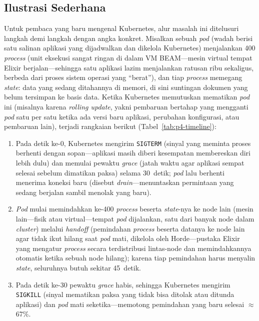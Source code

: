 \subsection{Ilustrasi Sederhana}
\label{subsec:p4-ilustrasi}
Untuk pembaca yang baru mengenal Kubernetes, alur masalah ini ditelusuri langkah demi
langkah dengan angka konkret. Misalkan sebuah \emph{pod} (wadah berisi satu salinan aplikasi
yang dijadwalkan dan dikelola Kubernetes) menjalankan 400 \emph{process} (unit eksekusi
sangat ringan di dalam VM BEAM---mesin virtual tempat Elixir berjalan---sehingga satu
aplikasi lazim menjalankan ratusan ribu sekaligus, berbeda dari proses sistem operasi yang
``berat''), dan tiap \emph{process} memegang \emph{state}: data yang sedang ditahannya di
memori, di sini suntingan dokumen yang belum tersimpan ke basis data. Ketika Kubernetes
memutuskan mematikan \emph{pod} ini (misalnya karena \emph{rolling update}, yakni pembaruan
bertahap yang mengganti \emph{pod} satu per satu ketika ada versi baru aplikasi, perubahan
konfigurasi, atau pembaruan lain), terjadi rangkaian berikut (Tabel~\ref{tab:p4-timeline}):

\begin{enumerate}[nosep,leftmargin=2em]
  \item Pada detik ke-0, Kubernetes mengirim \texttt{SIGTERM} (sinyal yang meminta proses
        berhenti dengan sopan---aplikasi masih diberi kesempatan membereskan diri lebih
        dulu) dan memulai pewaktu \emph{grace} (jatah waktu agar aplikasi sempat selesai
        sebelum dimatikan paksa) selama 30~detik; \emph{pod} lalu berhenti menerima koneksi
        baru (disebut \emph{drain}---menuntaskan permintaan yang sedang berjalan sambil
        menolak yang baru).
  \item \emph{Pod} mulai memindahkan ke-400 \emph{process} beserta \emph{state}-nya ke node
        lain (mesin lain---fisik atau virtual---tempat \emph{pod} dijalankan, satu dari
        banyak node dalam \emph{cluster}) melalui \emph{handoff} (pemindahan \emph{process}
        beserta datanya ke node lain agar tidak ikut hilang saat \emph{pod} mati, dikelola
        oleh Horde---pustaka Elixir yang mengatur \emph{process} secara terdistribusi
        lintas-node dan memindahkannya otomatis ketika sebuah node hilang); karena tiap
        pemindahan harus menyalin \emph{state}, seluruhnya butuh sekitar 45~detik.
  \item Pada detik ke-30 pewaktu \emph{grace} habis, sehingga Kubernetes mengirim
        \texttt{SIGKILL} (sinyal mematikan paksa yang tidak bisa ditolak atau ditunda
        aplikasi) dan \emph{pod} mati seketika---memotong pemindahan yang baru selesai
        $\approx$67\%.
\end{enumerate}


